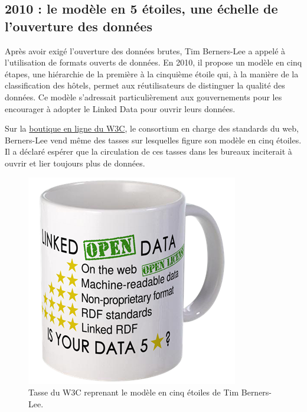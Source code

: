 \documentclass[]{book}
\theoremstyle{definition}
\theoremstyle{definition}
\theoremstyle{definition}
\theoremstyle{remark}
\begin{document}
\subsection{2010 : le modèle en 5 étoiles, une échelle de l'ouverture
des
données}\label{le-modele-en-5-etoiles-une-echelle-de-louverture-des-donnees}

Après avoir exigé l'ouverture des données brutes, Tim Berners-Lee a
appelé à l'utilisation de formats ouverts de données. En 2010, il
propose un modèle en cinq étapes, une hiérarchie de la première à la
cinquième étoile qui, à la manière de la classification des hôtels,
permet aux réutilisateurs de distinguer la qualité des données. Ce
modèle s'adressait particulièrement aux gouvernements pour les
encourager à adopter le Linked Data pour ouvrir leurs données.

Sur la \href{http://www.cafepress.com/w3c_shop.597992118}{boutique en
ligne du W3C}, le consortium en charge des standards du web, Berners-Lee
vend même des tasses sur lesquelles figure son modèle en cinq étoiles.
Il a déclaré espérer que la circulation de ces tasses dans les bureaux
inciterait à ouvrir et lier toujours plus de données.\\

\begin{figure}

{\centering \includegraphics[width=0.7\linewidth]{./img/mug} 

}

\caption{Tasse du W3C reprenant le modèle en cinq étoiles de Tim Berners-Lee.}\label{fig:unnamed-chunk-4}
\end{figure}
\end{document}
